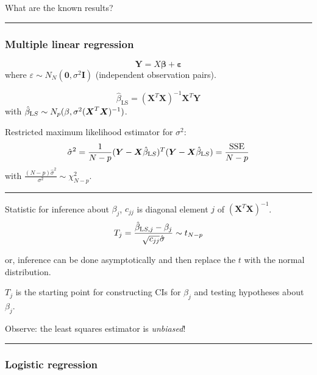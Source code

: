 \documentclass[
  letterpaper,
  DIV=11,
  numbers=noendperiod]{scrartcl}
\begin{document}
What are the known results?

\begin{center}\rule{0.5\linewidth}{0.5pt}\end{center}

\hypertarget{multiple-linear-regression}{%
\subsubsection{Multiple linear
regression}\label{multiple-linear-regression}}

\[{\boldsymbol Y=X \boldsymbol{\beta}}+{\boldsymbol \varepsilon}\] where
\(\varepsilon\sim N_N({\boldsymbol 0},\sigma^2{\boldsymbol I})\)
(independent observation pairs).

\[\hat{\beta}_{\text{LS}}=({\boldsymbol X}^T{\boldsymbol X})^{-1} {\boldsymbol X}^T {\boldsymbol Y}\]
with
\(\hat{\beta}_{\text LS}\sim N_{p}(\beta,\sigma^2({\boldsymbol X}^T{\boldsymbol X})^{-1})\).

Restricted maximum likelihood estimator for \(\sigma^2\):
\[\hat{\sigma}^2=\frac{1}{N-p}({\boldsymbol Y}-{\boldsymbol X}\hat{\beta}_{\text LS})^T({\boldsymbol Y}-{\boldsymbol X}\hat{\beta}_{\text LS})=\frac{\text{SSE}}{N-p}\]
with \(\frac{(N-p)\hat{\sigma}^2}{\sigma^2} \sim \chi^2_{N-p}\).

\begin{center}\rule{0.5\linewidth}{0.5pt}\end{center}

Statistic for inference about \(\beta_j\), \(c_{jj}\) is diagonal
element \(j\) of \(({\boldsymbol X}^T{\boldsymbol X})^{-1}\).
\[T_j=\frac{\hat{\beta}_{\text LS,j}-\beta_j}{\sqrt{c_{jj}}\hat{\sigma}}\sim t_{N-p}\]

or, inference can be done asymptotically and then replace the \(t\) with
the normal distribution.

\(T_j\) is the starting point for constructing CIs for \(\beta_j\) and
testing hypotheses about \(\beta_j\).

Observe: the least squares estimator is \emph{unbiased}!

\begin{center}\rule{0.5\linewidth}{0.5pt}\end{center}

\hypertarget{logistic-regression}{%
\subsubsection{Logistic regression}\label{logistic-regression}}
\end{document}
